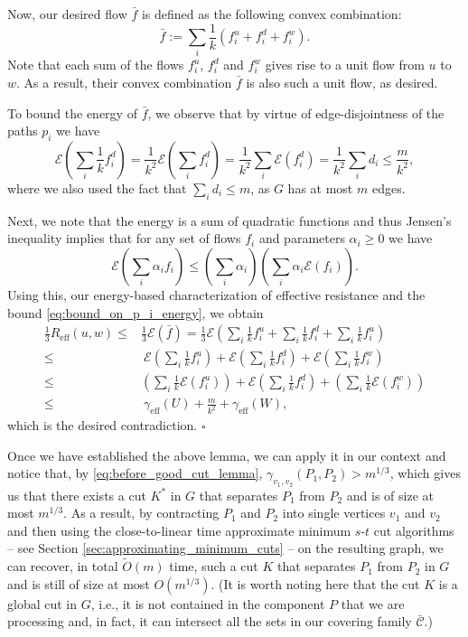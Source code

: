 \documentclass[11pt, letterpaper]{article}
\newenvironment{proof}{\noindent{\bf Proof:}\hspace*{1em}}{\qed\bigskip}
\newcommand{\qed}{\hfill\ensuremath{\square}}
\newcommand{\ocC}{\bar{\mathcal{C}}}
\newcommand{\tO}{\widetilde{O}}
\newcommand{\Reff}{R_{\mathrm{eff}}}
\newcommand{\diameff}{\gamma_{\mathrm{eff}}}
\newcommand{\energy}{\mathcal{E}}
\newcommand{\cut}{{K}}
\newcommand{\of}{\bar{f}}
\begin{document}
\begin{proof}
Now, our desired flow $\of$ is defined as the following convex combination:
\begin{equation*}
\of := \sum_i \frac{1}{k} \left( f_i^u + f_i^d + f_i^w \right).
\end{equation*}
Note that each sum of the flows $f_i^u$, $f_i^d$ and $f_i^w$ gives rise to a unit flow from $u$ to $w$. As a result, their convex combination $\of$ is also such a unit flow, as desired.

To bound the energy of $\of$, we observe that by virtue of edge-disjointness of the paths $p_i$ we have
\begin{equation}\label{eq:bound_on_p_i_energy}
\energy\left(\sum_i \frac{1}{k} f_i^d \right) = \frac{1}{k^2} \energy \left( \sum_i f_i^d \right) = \frac{1}{k^2} \sum_i \energy(f_i^d) = \frac{1}{k^2} \sum_i d_i \le \frac{m}{k^2},
\end{equation}
where we also used the fact that $\sum_i d_i\leq m$, as $G$ has at most $m$ edges.

Next, we note that the energy is a sum of quadratic functions and thus Jensen's inequality implies that for any set of flows $f_i$ and parameters $\alpha_i \ge 0$ we have 
\[
\energy \left( \sum_i \alpha_i f_i \right) \le \left( \sum_i \alpha_i \right) \left( \sum_i \alpha_i \energy(f_i) \right).
\] 
Using this, our energy-based characterization of effective resistance and the bound \eqref{eq:bound_on_p_i_energy}, we obtain
\begin{align*}
\frac 13 \Reff(u,w) \le& \frac 13 \energy(\of) =\frac{1}{3} \energy \left( \sum_i \frac 1k f_i^u + \sum_i \frac 1k f_i^d+ \sum_i \frac 1k f_i^u \right)\\
\le&\  \energy\left(\sum_i \frac 1k f_i^u\right) + \energy\left(\sum_i \frac 1k f_i^d\right) + \energy\left(\sum_i \frac 1k f_i^w\right) \\
\le& \left( \sum_i \frac 1k \energy(f_i^u) \right) + \energy \left( \sum_i \frac 1k f_i^d \right) + \left( \sum_i \frac 1k \energy(f_i^w) \right) \\
\le& \ \diameff(U) + \frac{m}{k^2} + \diameff(W),
\end{align*}
which is the desired contradiction.
\end{proof}

Once we have established the above lemma, we can apply it in our context and notice that, by \eqref{eq:before_good_cut_lemma}, $\gamma_{v_1,v_2}(P_1,P_2)>m^{1/3}$, which gives us that there exists a cut $K^*$ in $G$ that separates $P_1$ from $P_2$ and is of size at most $m^{1/3}$. As a result, by contracting $P_1$ and $P_2$ into single vertices $v_1$ and $v_2$ and then using the close-to-linear time approximate minimum $s$-$t$ cut algorithms -- see Section \ref{sec:approximating_minimum_cuts} -- on the resulting graph, we can recover, in total $\tO(m)$ time, such a cut $\cut$ that separates $P_1$ from $P_2$ in $G$ and is still of size at most $O(m^{1/3})$. (It is worth noting here that the cut $\cut$ is a global cut in $G$, i.e., it is not contained in the component $P$ that we are processing and, in fact, it can intersect all the sets in our covering family $\ocC$.)  
\end{document}
